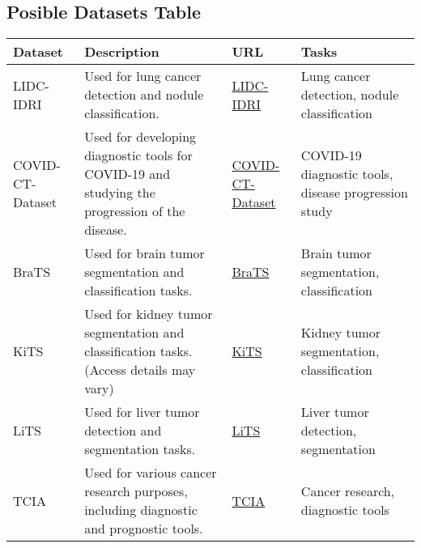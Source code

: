\subsection {Posible Datasets Table}
\begin{table}[ht]
\centering
\begin{tabular}{|l|p{5cm}|l|p{5cm}|}
\hline
\textbf{Dataset}                & \textbf{Description}                                                                                                 & \textbf{URL}                                                              & \textbf{Tasks}                                        \\ \hline
LIDC-IDRI                        & Used for lung cancer detection and nodule classification.                                                            & \href{https://www.cancerimagingarchive.net/collection/lidc-idri/}{LIDC-IDRI} & Lung cancer detection, nodule classification          \\ \hline
COVID-CT-Dataset                 & Used for developing diagnostic tools for COVID-19 and studying the progression of the disease.                   & \href{https://www.ncbi.nlm.nih.gov/pmc/articles/PMC8114670/}{COVID-CT-Dataset} & COVID-19 diagnostic tools, disease progression study \\ \hline
BraTS                            & Used for brain tumor segmentation and classification tasks.                                                          & \href{http://braintumorsegmentation.org/}{BraTS}                           & Brain tumor segmentation, classification              \\ \hline
KiTS                             & Used for kidney tumor segmentation and classification tasks. (Access details may vary)                               & \href{https://kits-challenge.org/kits23/}{KiTS}                             & Kidney tumor segmentation, classification            \\ \hline
LiTS                             & Used for liver tumor detection and segmentation tasks.                                                                 & \href{https://www.sciencedirect.com/science/article/pii/S1361841522003085}{LiTS} & Liver tumor detection, segmentation                   \\ \hline
TCIA                             & Used for various cancer research purposes, including diagnostic and prognostic tools.                               & \href{https://www.cancerimagingarchive.net/browse-collections/}{TCIA}      & Cancer research, diagnostic tools                    \\ \hline

\end{tabular}
\end{table}

